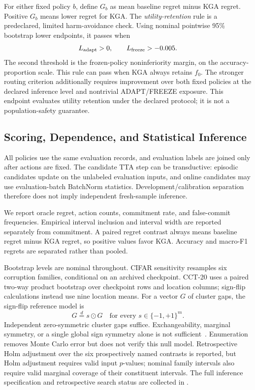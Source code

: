 For either fixed policy $b$, define $G_b$ as mean baseline regret minus KGA regret.
Positive $G_b$ means lower regret for KGA. The \emph{utility-retention} rule is a predeclared,
limited harm-avoidance check. Using nominal pointwise 95\% bootstrap lower endpoints, it passes when
\begin{equation}
 L_{\mathrm{adapt}}>0,\qquad
 L_{\mathrm{freeze}}>-0.005.
 \label{eq:cct-safe-utility}
\end{equation}
The second threshold is the frozen-policy noninferiority margin, on the accuracy-proportion scale.
This rule can pass when KGA always retains $f_0$. The stronger routing criterion additionally
requires improvement over both fixed policies at the declared inference level and nontrivial
ADAPT/FREEZE exposure. This endpoint evaluates utility retention under the declared protocol; it is not a population-safety guarantee.

\subsection{Scoring, Dependence, and Statistical Inference}
\label{sec:compact-inference-units}

All policies use the same evaluation records, and evaluation labels are joined only after actions
are fixed. The candidate TTA step can be transductive: episodic candidates update on the unlabeled
evaluation inputs, and online candidates may use evaluation-batch BatchNorm statistics.
Development/calibration separation therefore does not imply independent fresh-sample inference.

We report oracle regret, action counts, commitment rate, and false-commit frequencies. Empirical
interval inclusion and interval width are reported separately from commitment.
A paired regret contrast always means baseline regret minus KGA regret, so positive values favor
KGA. Accuracy and macro-F1 regrets are separated rather than pooled.

Bootstrap levels are nominal throughout. CIFAR sensitivity resamples six corruption families,
conditional on an archived checkpoint. CCT-20 uses a paired two-way product bootstrap over
checkpoint rows and location columns; sign-flip calculations instead use nine location means.
For a vector $G$ of cluster gaps, the sign-flip reference model is
\begin{equation}
 G\overset{d}{=}s\odot G
 \quad\text{for every }s\in\{-1,+1\}^{m}.
 \label{eq:compact-signflip-null}
\end{equation}
Independent zero-symmetric cluster gaps suffice. Exchangeability, marginal symmetry, or a single
global sign symmetry alone is not sufficient~\cite{hemerik2018exact}. Enumeration removes Monte
Carlo error but does not verify this null model. Retrospective Holm adjustment over the six prospectively named contrasts is reported, but Holm adjustment requires valid input $p$-values;
nominal family intervals also require valid marginal coverage of their constituent intervals.
The full inference specification and retrospective search status are collected in
.


